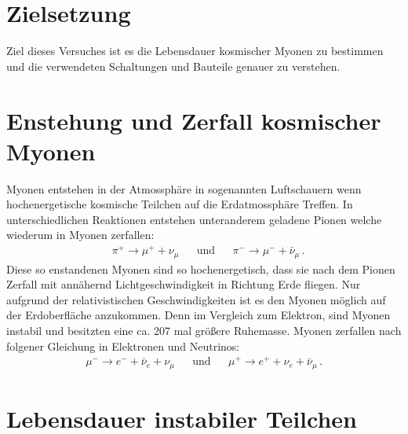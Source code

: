 \section{Zielsetzung}
    Ziel dieses Versuches ist es die Lebensdauer kosmischer Myonen zu bestimmen und die verwendeten Schaltungen und Bauteile genauer zu verstehen.

    \section{Enstehung und Zerfall kosmischer Myonen}
        Myonen entstehen in der Atmossphäre in sogenannten Luftschauern wenn hochenergetische kosmische Teilchen auf die Erdatmossphäre Treffen.
        In unterschiedlichen Reaktionen entstehen unteranderem geladene Pionen welche wiederum in Myonen zerfallen:
        \begin{align}
            &\pi^+ \rightarrow \mu^+ + \nu_\mu && \text{und} && \pi^- \rightarrow \mu^- + \bar{\nu}_\mu \, .
        \end{align}
        Diese so enstandenen Myonen sind so hochenergetisch, dass sie nach dem Pionen Zerfall mit annähernd Lichtgeschwindigkeit in Richtung Erde fliegen.
        Nur aufgrund der relativistischen Geschwindigkeiten ist es den Myonen möglich auf der Erdoberfläche anzukommen. 
        Denn im Vergleich zum Elektron, sind Myonen instabil und besitzten eine ca. 207 mal größere Ruhemasse. 
        Myonen zerfallen nach folgener Gleichung in Elektronen und Neutrinos:
        \begin{align}
            \mu^- \rightarrow e^- + \bar{\nu}_e + \nu_\mu && \text{und} &&  \mu^+ \rightarrow e^+ + \nu_e + \bar{\nu}_\mu \, . 
        \end{align} 

    \section{Lebensdauer instabiler Teilchen}

